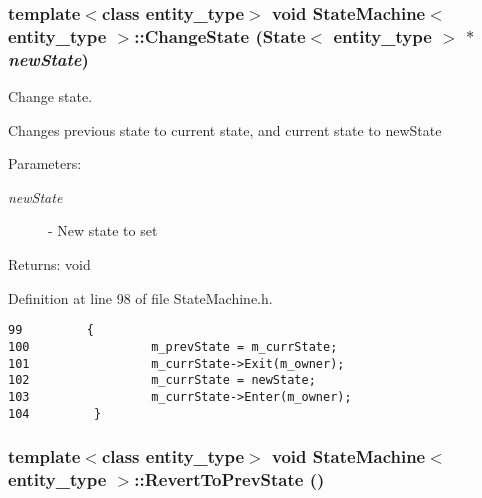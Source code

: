 \hypertarget{class_state_machine_916699645fd8deb8f0d757825d300d01}{
\subsubsection[ChangeState]{\setlength{\rightskip}{0pt plus 5cm}template$<$class entity\_\-type$>$ void {\bf StateMachine}$<$ entity\_\-type $>$::ChangeState ({\bf State}$<$ entity\_\-type $>$ $\ast$ {\em newState})}}
\label{class_state_machine_916699645fd8deb8f0d757825d300d01}


Change state. 

Changes previous state to current state, and current state to newState

\begin{Desc}
\item[Parameters:]
\begin{description}
\item[{\em newState}]- New state to set\end{description}
\end{Desc}
\begin{Desc}
\item[Returns:]void \end{Desc}


Definition at line 98 of file StateMachine.h.

\begin{Code}\begin{verbatim}99         {
100                 m_prevState = m_currState;
101                 m_currState->Exit(m_owner);
102                 m_currState = newState;
103                 m_currState->Enter(m_owner);
104         }
\end{verbatim}
\end{Code}


\hypertarget{class_state_machine_93ba40368fa2e9d4985f1bb0c1b7e55a}{
\subsubsection[RevertToPrevState]{\setlength{\rightskip}{0pt plus 5cm}template$<$class entity\_\-type$>$ void {\bf StateMachine}$<$ entity\_\-type $>$::RevertToPrevState ()}}
\label{class_state_machine_93ba40368fa2e9d4985f1bb0c1b7e55a}


